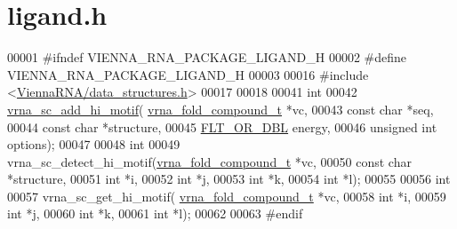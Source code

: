 \hypertarget{ligand_8h_source}{}\section{ligand.\+h}
\label{ligand_8h_source}

\begin{DoxyCode}
00001 \textcolor{preprocessor}{#ifndef VIENNA\_RNA\_PACKAGE\_LIGAND\_H}
00002 \textcolor{preprocessor}{#define VIENNA\_RNA\_PACKAGE\_LIGAND\_H}
00003 
00016 \textcolor{preprocessor}{#include <\hyperlink{data__structures_8h}{ViennaRNA/data\_structures.h}>}
00017 
00018 
00041 \textcolor{keywordtype}{int}
00042 \hyperlink{group__ligands_gaa6ff0113a3a76dc0b8d62961f4e1dfa0}{vrna\_sc\_add\_hi\_motif}( \hyperlink{group__fold__compound_structvrna__fc__s}{vrna\_fold\_compound\_t} *vc,
00043                       \textcolor{keyword}{const} \textcolor{keywordtype}{char} *seq,
00044                       \textcolor{keyword}{const} \textcolor{keywordtype}{char} *structure,
00045                       \hyperlink{group__data__structures_ga31125aeace516926bf7f251f759b6126}{FLT\_OR\_DBL} energy,
00046                       \textcolor{keywordtype}{unsigned} \textcolor{keywordtype}{int} options);
00047 
00048 \textcolor{keywordtype}{int}
00049 vrna\_sc\_detect\_hi\_motif(\hyperlink{group__fold__compound_structvrna__fc__s}{vrna\_fold\_compound\_t} *vc,
00050                         \textcolor{keyword}{const} \textcolor{keywordtype}{char} *structure,
00051                         \textcolor{keywordtype}{int} *i,
00052                         \textcolor{keywordtype}{int} *j,
00053                         \textcolor{keywordtype}{int} *k,
00054                         \textcolor{keywordtype}{int} *l);
00055 
00056 \textcolor{keywordtype}{int}
00057 vrna\_sc\_get\_hi\_motif( \hyperlink{group__fold__compound_structvrna__fc__s}{vrna\_fold\_compound\_t} *vc,
00058                       \textcolor{keywordtype}{int} *i,
00059                       \textcolor{keywordtype}{int} *j,
00060                       \textcolor{keywordtype}{int} *k,
00061                       \textcolor{keywordtype}{int} *l);
00062 
00063 \textcolor{preprocessor}{#endif}
\end{DoxyCode}
